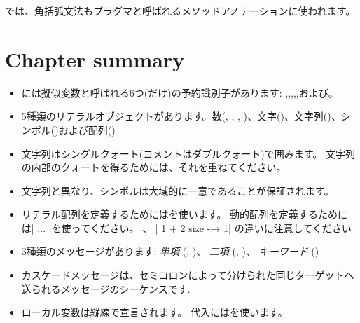 \documentclass[a4paper,10pt,twoside]{book}
\begin{document}


\pharo では、角括弧文法もプラグマと呼ばれるメソッドアノテーションに使われます。

\section{Chapter summary}

\begin{itemize}

\item	\pharo には擬似変数と呼ばれる6つ(だけ)の予約識別子があります: ,,,,,および。

\item	5種類のリテラルオブジェクトがあります。数(, , , )、文字()、文字列()、シンボル()および配列()

\item	文字列はシングルクォート(コメントはダブルクォート)で囲みます。
		文字列の内部のクォートを得るためには、それを重ねてください。

\item	文字列と異なり、シンボルは大域的に一意であることが保証されます。

\item	リテラル配列を定義するためにはを使います。
		動的配列を定義するためには\ct|{ ... }|を使ってください。
		、
		\ct|{ 1 + 2 } size -→ 1|
		の違いに注意してください

\item	3種類のメッセージがあります:
		\emph{単項} (\eg {}, )、
		\emph{二項} (\eg {}, )、
		\emph{キーワード} (\eg {})

\item	カスケードメッセージは、セミコロンによって分けられた同じターゲットへ送られるメッセージのシーケンスです.

\item	ローカル変数は縦線で宣言されます。
		代入には\ct{:=}を使います。


\end{itemize}
\end{document}

